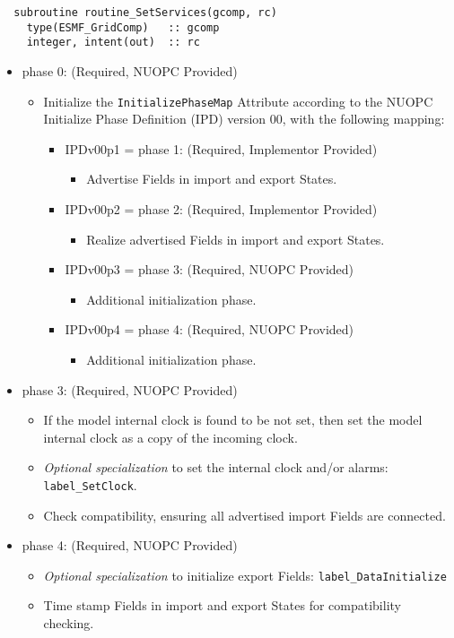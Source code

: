 \begin{verbatim}  subroutine routine_SetServices(gcomp, rc)
    type(ESMF_GridComp)   :: gcomp
    integer, intent(out)  :: rc
\end{verbatim}

\begin{itemize}
\item phase 0: ({\sc Required, NUOPC Provided})
  \begin{itemize}
  \item Initialize the {\tt InitializePhaseMap} Attribute according to the NUOPC Initialize Phase Definition (IPD) version 00, with the following mapping:
    \begin{itemize}
    \item IPDv00p1 = phase 1: ({\sc Required, Implementor Provided})
      \begin{itemize}
      \item Advertise Fields in import and export States.
      \end{itemize}
    \item IPDv00p2 = phase 2: ({\sc Required, Implementor Provided})
      \begin{itemize}
      \item Realize advertised Fields in import and export States.
      \end{itemize}  
    \item IPDv00p3 = phase 3: ({\sc Required, NUOPC Provided})
      \begin{itemize}
      \item Additional initialization phase.
      \end{itemize}
    \item IPDv00p4 = phase 4: ({\sc Required, NUOPC Provided})
      \begin{itemize}
      \item Additional initialization phase.
      \end{itemize}
    \end{itemize}  
  \end{itemize}  
\item phase 3: ({\sc Required, NUOPC Provided})
  \begin{itemize}
  \item If the model internal clock is found to be not set, then set the model internal clock as a copy of the incoming clock. 
  \item {\it Optional specialization} to set the internal clock and/or alarms: {\tt label\_SetClock}.
  \item Check compatibility, ensuring all advertised import Fields are connected.
  \end{itemize}  
\item phase 4: ({\sc Required, NUOPC Provided})
  \begin{itemize}
  \item {\it Optional specialization} to initialize export Fields: {\tt label\_DataInitialize}
  \item Time stamp Fields in import and export States for compatibility checking.
  \end{itemize}    
\end{itemize}

